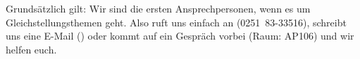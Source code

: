 \begin{multicols}{2}
Grundsätzlich gilt: Wir sind die ersten Ansprechpersonen, wenn es um Gleichstellungsthemen geht. Also ruft uns einfach an \mbox{(0251 83-33516)}, schreibt uns eine E-Mail (\textbf{}) oder kommt auf ein Gespräch vorbei (Raum: AP106) und wir helfen euch.


\end{multicols}
